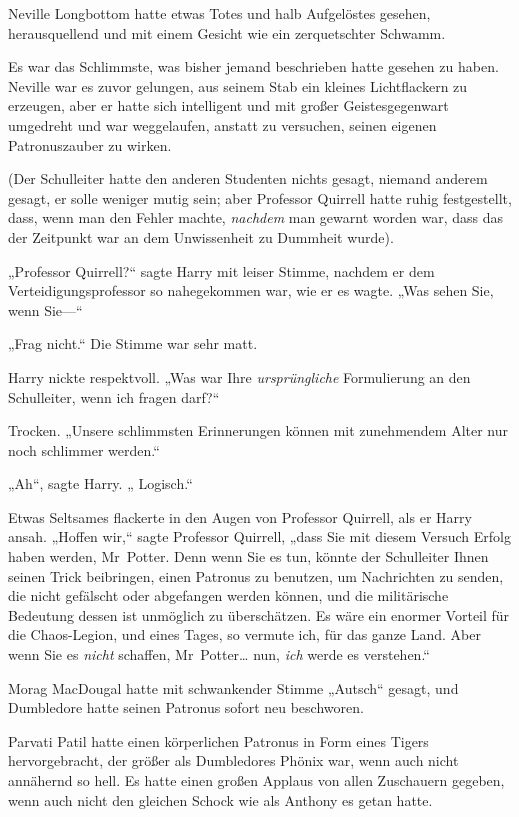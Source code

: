 {Neville Longbottom hatte etwas Totes und halb Aufgelöstes gesehen, herausquellend und mit einem Gesicht wie ein zerquetschter Schwamm.

Es war das Schlimmste, was bisher jemand beschrieben hatte gesehen zu haben. Neville war es zuvor gelungen, aus seinem Stab ein kleines Lichtflackern zu erzeugen, aber er hatte sich intelligent und mit großer Geistesgegenwart umgedreht und war weggelaufen, anstatt zu versuchen, seinen eigenen Patronuszauber zu wirken.

(Der Schulleiter hatte den anderen Studenten nichts gesagt, niemand anderem gesagt, er solle weniger mutig sein; aber Professor Quirrell hatte ruhig festgestellt, dass, wenn man den Fehler machte, \emph{nachdem} man gewarnt worden war, dass das der Zeitpunkt war an dem Unwissenheit zu Dummheit wurde).

„Professor Quirrell?“ sagte Harry mit leiser Stimme, nachdem er dem Verteidigungsprofessor so nahegekommen war, wie er es wagte. „Was sehen Sie, wenn Sie—“

„Frag nicht.“ Die Stimme war sehr matt.

Harry nickte respektvoll. „Was war Ihre \emph{ursprüngliche} Formulierung an den Schulleiter, wenn ich fragen darf?“

Trocken. „Unsere schlimmsten Erinnerungen können mit zunehmendem Alter nur noch schlimmer werden.“

„Ah“, sagte Harry. „ Logisch.“

Etwas Seltsames flackerte in den Augen von Professor Quirrell, als er Harry ansah. „Hoffen wir,“ sagte Professor Quirrell, „dass Sie mit diesem Versuch Erfolg haben werden, Mr~Potter. Denn wenn Sie es tun, könnte der Schulleiter Ihnen seinen Trick beibringen, einen Patronus zu benutzen, um Nachrichten zu senden, die nicht gefälscht oder abgefangen werden können, und die militärische Bedeutung dessen ist unmöglich zu überschätzen. Es wäre ein enormer Vorteil für die Chaos-Legion, und eines Tages, so vermute ich, für das ganze Land. Aber wenn Sie es \emph{nicht} schaffen, Mr~Potter… nun, \emph{ich} werde es verstehen.“

Morag MacDougal hatte mit schwankender Stimme „Autsch“ gesagt, und Dumbledore hatte seinen Patronus sofort neu beschworen.

Parvati Patil hatte einen körperlichen Patronus in Form eines Tigers hervorgebracht, der größer als Dumbledores Phönix war, wenn auch nicht annähernd so hell. Es hatte einen großen Applaus von allen Zuschauern gegeben, wenn auch nicht den gleichen Schock wie als Anthony es getan hatte.

}
